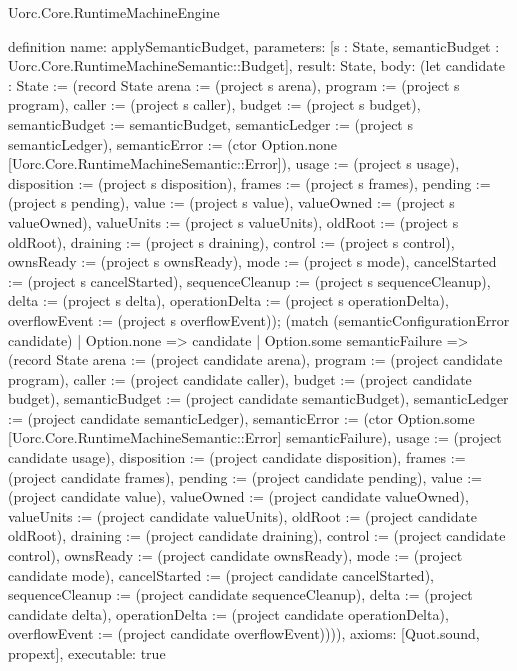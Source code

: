 \begin{lexlean}{Uorc.Core.RuntimeMachineEngine}
\begin{semanticmodule}
definition{
  name: applySemanticBudget,
  parameters: [s : State, semanticBudget : Uorc.Core.RuntimeMachineSemantic::Budget],
  result: State,
  body: (let candidate : State := (record State {arena := (project s arena), program := (project s program), caller := (project s caller), budget := (project s budget), semanticBudget := semanticBudget, semanticLedger := (project s semanticLedger), semanticError := (ctor Option.none [Uorc.Core.RuntimeMachineSemantic::Error]), usage := (project s usage), disposition := (project s disposition), frames := (project s frames), pending := (project s pending), value := (project s value), valueOwned := (project s valueOwned), valueUnits := (project s valueUnits), oldRoot := (project s oldRoot), draining := (project s draining), control := (project s control), ownsReady := (project s ownsReady), mode := (project s mode), cancelStarted := (project s cancelStarted), sequenceCleanup := (project s sequenceCleanup), delta := (project s delta), operationDelta := (project s operationDelta), overflowEvent := (project s overflowEvent)}); (match (semanticConfigurationError candidate)
    | Option.none => candidate
    | Option.some semanticFailure => (record State {arena := (project candidate arena), program := (project candidate program), caller := (project candidate caller), budget := (project candidate budget), semanticBudget := (project candidate semanticBudget), semanticLedger := (project candidate semanticLedger), semanticError := (ctor Option.some [Uorc.Core.RuntimeMachineSemantic::Error] semanticFailure), usage := (project candidate usage), disposition := (project candidate disposition), frames := (project candidate frames), pending := (project candidate pending), value := (project candidate value), valueOwned := (project candidate valueOwned), valueUnits := (project candidate valueUnits), oldRoot := (project candidate oldRoot), draining := (project candidate draining), control := (project candidate control), ownsReady := (project candidate ownsReady), mode := (project candidate mode), cancelStarted := (project candidate cancelStarted), sequenceCleanup := (project candidate sequenceCleanup), delta := (project candidate delta), operationDelta := (project candidate operationDelta), overflowEvent := (project candidate overflowEvent)}))),
  axioms: [Quot.sound, propext],
  executable: true
}


\end{semanticmodule}
\end{lexlean}
